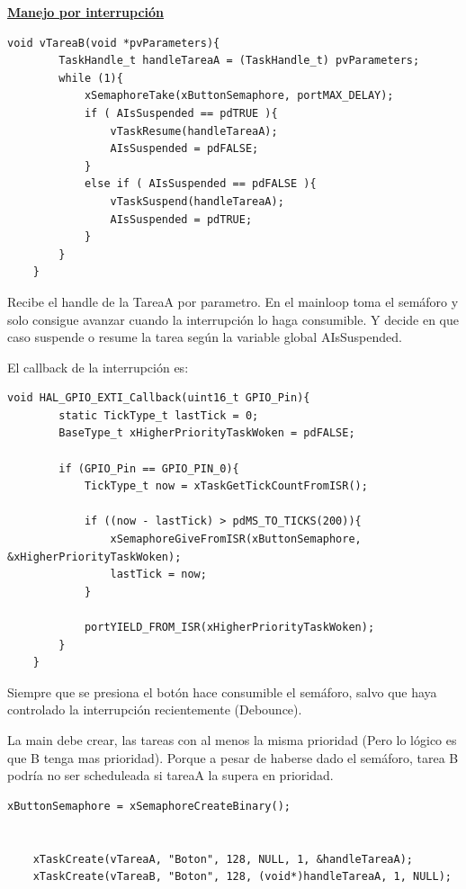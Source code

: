 \documentclass[12pt]{article}
\begin{document}
\underline{\textbf{Manejo por interrupción}}
\begin{lstlisting}[style=CStyle]
    void vTareaB(void *pvParameters){
        TaskHandle_t handleTareaA = (TaskHandle_t) pvParameters;
        while (1){
            xSemaphoreTake(xButtonSemaphore, portMAX_DELAY);
            if ( AIsSuspended == pdTRUE ){
                vTaskResume(handleTareaA);
                AIsSuspended = pdFALSE;
            }
            else if ( AIsSuspended == pdFALSE ){
                vTaskSuspend(handleTareaA);
                AIsSuspended = pdTRUE;
            }
        }
    }       
\end{lstlisting}
Recibe el handle de la TareaA por parametro.
En el mainloop toma el semáforo y solo
consigue avanzar cuando la interrupción lo
haga consumible.
Y decide en que caso suspende o resume la tarea
según la variable global AIsSuspended.

El callback de la interrupción es:

\begin{lstlisting}[style=CStyle]
    void HAL_GPIO_EXTI_Callback(uint16_t GPIO_Pin){
        static TickType_t lastTick = 0;
        BaseType_t xHigherPriorityTaskWoken = pdFALSE;

        if (GPIO_Pin == GPIO_PIN_0){
            TickType_t now = xTaskGetTickCountFromISR();

            if ((now - lastTick) > pdMS_TO_TICKS(200)){
                xSemaphoreGiveFromISR(xButtonSemaphore, &xHigherPriorityTaskWoken);
                lastTick = now;
            }

            portYIELD_FROM_ISR(xHigherPriorityTaskWoken);
        }
    }

\end{lstlisting}
Siempre que se presiona el botón hace consumible el semáforo, salvo
que haya controlado la interrupción recientemente (Debounce).

La main debe crear, las tareas con al menos la misma prioridad (Pero lo lógico es que B tenga mas prioridad). Porque
a pesar de haberse dado el semáforo, tarea B podría no ser scheduleada
si tareaA la supera en prioridad.
\pagebreak

\begin{lstlisting}[style=CStyle]
    xButtonSemaphore = xSemaphoreCreateBinary();


    xTaskCreate(vTareaA, "Boton", 128, NULL, 1, &handleTareaA);
    xTaskCreate(vTareaB, "Boton", 128, (void*)handleTareaA, 1, NULL);
    
\end{lstlisting}
\end{document}

